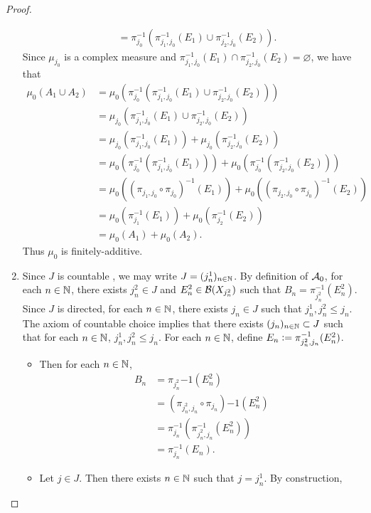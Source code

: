 \documentclass{book}
\begin{document}
\begin{proof}
\begin{enumerate}
\begin{align*}
			& = \pi_{j_0}^{-1}(\pi_{j_1, j_0}^{-1}(E_1) \cup \pi_{j_2, j_0}^{-1}(E_2)).
		\end{align*}
		Since $\mu_{j_0}$ is a complex measure and $\pi_{j_1, j_0}^{-1}(E_1) \cap \pi_{j_2, j_0}^{-1}(E_2) = \varnothing$, we have that 
		\begin{align*}
			\mu_0(A_1 \cup A_2) 
			& = \mu_0(\pi_{j_0}^{-1}(\pi_{j_1, j_0}^{-1}(E_1) \cup \pi_{j_2, j_0}^{-1}(E_2))) \\
			& = \mu_{j_0}(\pi_{j_1, j_0}^{-1}(E_1) \cup \pi_{j_2, j_0}^{-1}(E_2)) \\
			& = \mu_{j_0}(\pi_{j_1, j_0}^{-1}(E_1)) + \mu_{j_0}(\pi_{j_2, j_0}^{-1}(E_2)) \\
			& = \mu_0(\pi_{j_0}^{-1}(\pi_{j_1, j_0}^{-1}(E_1))) + \mu_0(\pi_{j_0}^{-1}(\pi_{j_2, j_0}^{-1}(E_2))) \\
			& = \mu_0((\pi_{j_1, j_0} \circ \pi_{j_0})^{-1}(E_1)) + \mu_0((\pi_{j_2, j_0} \circ \pi_{j_0})^{-1}(E_2)) \\
			& = \mu_0(\pi_{j_1}^{-1}(E_1)) + \mu_0(\pi_{j_2}^{-1}(E_2)) \\
			& = \mu_0(A_1) + \mu_0(A_2).
		\end{align*}
		Thus $\mu_0$ is finitely-additive. 
		\item Since $J$ is countable , we may write $J = (j^1_n)_{n \in \mathbb{N}}$. By definition of $\mathcal{A}_0$, for each $n \in \mathbb{N}$, there exists $j^2_n \in J$ and $E^2_n \in \mathcal{B}(X_{j^2_n})$ such that $B_n = \pi_{j^2_n}^{-1}(E^2_n)$. Since $J$ is directed, for each $n \in \mathbb{N}$, there exists $j_n \in J$ such that $j^1_n, j^2_n \leq j_n$. The axiom of countable choice implies that there exists $(j_n)_{n \in \mathbb{N}} \subset J$ such that for each $n \in \mathbb{N}$, $j^1_n, j^2_n \leq j_n$. For each $n \in \mathbb{N}$, define $E_n \vcentcolon= \pi_{j^2_n, j_n}^{-1}(E^2_n)$. 
		\begin{itemize}
			\item Then for each $n \in \mathbb{N}$, 
			\begin{align*}
				B_n
				& = \pi_{j^2_n}{-1}(E^2_n) \\
				& = (\pi_{j^2_n, j_n} \circ \pi_{j_n}){-1}(E^2_n) \\
				& = \pi_{j_n}^{-1}(\pi_{j^2_n, j_n}^{-1}(E^2_n)) \\
				& = \pi_{j_n}^{-1}(E_n).
			\end{align*}
			\item Let $j \in J$. Then there exists $n \in \mathbb{N}$ such that $j = j^1_n$. By construction, 

\end{itemize}
\end{enumerate}
\end{proof}
\end{document}
